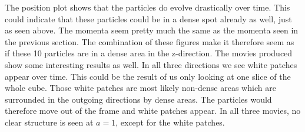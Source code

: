 The position plot shows that the particles do evolve drastically over time. This could indicate that these particles could be in a dense spot already as well, just as seen above. The momenta seem pretty much the same as the momenta seen in the previous section. The combination of these figures make it therefore seem as if these 10 particles are in a dense area in the z-direction. The movies produced show some interesting results as well. In all three directions we see white patches appear over time. This could be the result of us only looking at one slice of the whole cube. Those white patches are most likely non-dense areas which are surrounded in the outgoing directions by dense areas. The particles would therefore move out of the frame and white patches appear. In all three movies, no clear structure is seen at $a = 1$, except for the white patches.

\clearpage